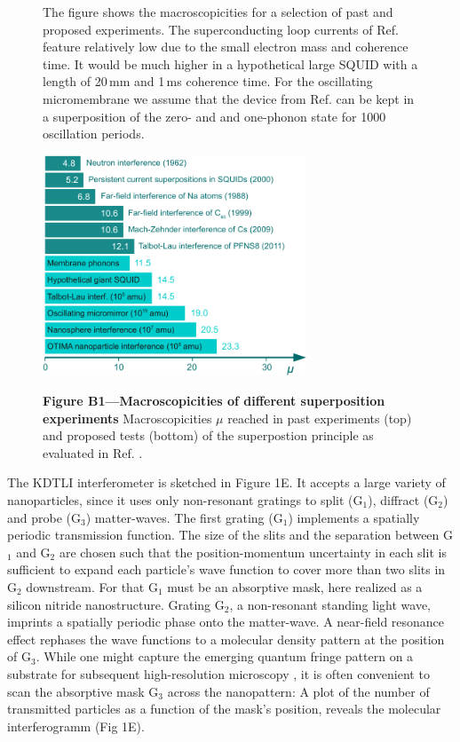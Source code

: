 \documentclass[11pt]{article}
\begin{document}
\begin{figure}
\begin{framed}
\hspace{1.5em}The figure shows the macroscopicities for a selection of past and proposed experiments. The superconducting loop currents of Ref.  feature relatively low
due to the small electron mass and coherence time. It would be much higher in a hypothetical large SQUID with a length of 20\,mm and 1\,ms coherence time. For the oscillating micromembrane we assume that the device from Ref.  can be kept in a superposition of the zero- and  and one-phonon state for 1000 oscillation periods.

\vspace*{2ex}
\centerline{
\includegraphics[width=0.7\textwidth]{FigB.pdf}}
{\small\noindent
{\bfseries\sffamily Figure B1---Macroscopicities of different superposition experiments}
Macroscopicities $\mu$ reached in past experiments (top) and proposed tests (bottom) of the superpostion principle  as evaluated in Ref. .
}
\end{framed}
\end{figure}


The KDTLI interferometer is sketched in Figure 1E. It accepts a large variety of nanoparticles,
since it uses only non-resonant gratings to split (G$_1$), 
diffract (G$_2$) and probe (G$_3$) matter-waves.
The first grating (G$_1$) implements a spatially periodic transmission function. 
The size of the slits and the separation between G$_1$ and G$_2$ are chosen such that the position-momentum uncertainty in each
slit is sufficient to expand each particle's wave function to cover more than two slits
in G$_2$ downstream. For that G$_1$ must be an absorptive mask, here realized as a silicon nitride nanostructure.
Grating G$_2$, a non-resonant standing light wave, imprints a spatially periodic phase onto the matter-wave.
A near-field resonance effect rephases the wave functions to a molecular density pattern at the position of G$_3$.
While one might capture the emerging quantum fringe pattern on a substrate for subsequent high-resolution microscopy \cite{Juffmann2009, Juffmann2012a},
it is often convenient to scan the absorptive mask G$_3$ across the nanopattern: 
A plot of the number of transmitted particles as a function of the mask's position, reveals the molecular interferogramm (Fig 1E).
\end{document}
